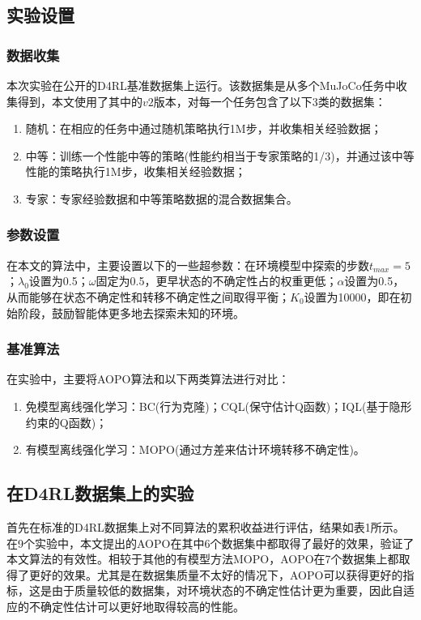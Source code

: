 \documentclass{article}
\begin{document}
\subsection{实验设置}
\subsubsection{数据收集}
本次实验在公开的D4RL基准数据集上运行。该数据集是从多个MuJoCo任务中收集得到，本文使用了其中的$v2$版本，对每一个任务包含了以下3类的数据集：
\begin{enumerate}
  \item 随机：在相应的任务中通过随机策略执行1M步，并收集相关经验数据；
  \item 中等：训练一个性能中等的策略(性能约相当于专家策略的1/3)，并通过该中等性能的策略执行1M步，收集相关经验数据；
  \item 专家：专家经验数据和中等策略数据的混合数据集合。
\end{enumerate}

\subsubsection{参数设置}
在本文的算法中，主要设置以下的一些超参数：在环境模型中探索的步数$t_{max}=5$；$\lambda_0$设置为0.5；$\omega$固定为0.5，更早状态的不确定性占的权重更低；$\alpha$设置为0.5，从而能够在状态不确定性和转移不确定性之间取得平衡；$K_0$设置为10000，即在初始阶段，鼓励智能体更多地去探索未知的环境。

\subsubsection{基准算法}
在实验中，主要将AOPO算法和以下两类算法进行对比：
\begin{enumerate}
  \item 免模型离线强化学习：BC(行为克隆)；CQL(保守估计Q函数)；IQL(基于隐形约束的Q函数)；
  \item 有模型离线强化学习：MOPO(通过方差来估计环境转移不确定性)。
\end{enumerate}

\subsection{在D4RL数据集上的实验}
首先在标准的D4RL数据集上对不同算法的累积收益进行评估，结果如表1所示。在9个实验中，本文提出的AOPO在其中6个数据集中都取得了最好的效果，验证了本文算法的有效性。相较于其他的有模型方法MOPO，AOPO在7个数据集上都取得了更好的效果。尤其是在数据集质量不太好的情况下，AOPO可以获得更好的指标，这是由于质量较低的数据集，对环境状态的不确定性估计更为重要，因此自适应的不确定性估计可以更好地取得较高的性能。
\end{document}
